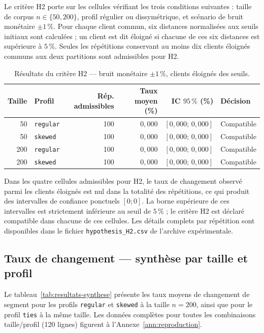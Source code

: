 Le critère H2 porte sur les cellules vérifiant les trois conditions suivantes : taille de
corpus $n \in \{50, 200\}$, profil régulier ou dissymétrique, et scénario de bruit monétaire
$\pm1\,\%$. Pour chaque client commun, six distances normalisées aux seuils initiaux sont
calculées ; un client est dit éloigné si chacune de ces six distances est supérieure à
$5\,\%$. Seules les répétitions conservant au moins dix clients éloignés communs aux deux
partitions sont admissibles pour H2.

\begin{table}[htb]
  \centering
  \caption{Résultats du critère H2 — bruit monétaire $\pm1\,\%$, clients éloignés des seuils.}
  \label{tab:resultats-h2}
  \begin{tabular}{rlrrrl}
    \toprule
    Taille & Profil & Rép. admissibles & Taux moyen (\%) & IC $95\,\%$ (\%) & Décision \\
    \midrule
    50  & \texttt{regular} & 100 & $0{,}000$ & $[0{,}000;\,0{,}000]$ & Compatible \\
    50  & \texttt{skewed}  & 100 & $0{,}000$ & $[0{,}000;\,0{,}000]$ & Compatible \\
    200 & \texttt{regular} & 100 & $0{,}000$ & $[0{,}000;\,0{,}000]$ & Compatible \\
    200 & \texttt{skewed}  & 100 & $0{,}000$ & $[0{,}000;\,0{,}000]$ & Compatible \\
    \bottomrule
  \end{tabular}
\end{table}

Dans les quatre cellules admissibles pour H2, le taux de changement observé parmi les clients
éloignés est nul dans la totalité des répétitions, ce qui produit des intervalles de confiance
ponctuels $[0;0]$. La borne supérieure de ces intervalles est strictement inférieure au seuil
de $5\,\%$ ; le critère H2 est déclaré compatible dans chacune de ces cellules. Les détails
complets par répétition sont disponibles dans le fichier \texttt{hypothesis\_H2.csv} de
l'archive expérimentale.

\subsection{Taux de changement — synthèse par taille et profil}
\label{subsec:resultats-synthese}

Le tableau~\ref{tab:resultats-synthese} présente les taux moyens de changement de segment
pour les profils \texttt{regular} et \texttt{skewed} à la taille $n = 200$, ainsi que pour
le profil \texttt{ties} à la même taille. Les données complètes pour toutes les combinaisons
taille/profil (120 lignes) figurent à l'Annexe~\ref{ann:reproduction}.

